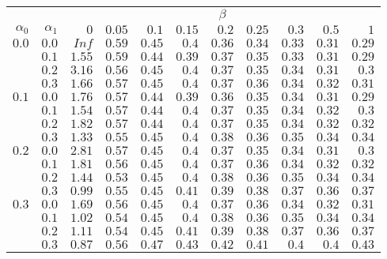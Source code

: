 \begin{tabular}{rr|rrrrrrrrr}
\hline\hline
 && \multicolumn{9}{c}{$\beta$}\\
 $\alpha_0$ & $\alpha_1$ & $0$ & $0.05$ & $0.1$ & $0.15$ & $0.2$ & $0.25$ & $0.3$ & $0.5$ & $1$ \\ 
 \hline
$0.0$ & $0.0$ & $Inf$ & $0.59$ & $0.45$ & $0.4$ & $0.36$ & $0.34$ & $0.33$ & $0.31$ & $0.29$\\ 
 & $0.1$ & $1.55$ & $0.59$ & $0.44$ & $0.39$ & $0.37$ & $0.35$ & $0.33$ & $0.31$ & $0.29$\\ 
 & $0.2$ & $3.16$ & $0.56$ & $0.45$ & $0.4$ & $0.37$ & $0.35$ & $0.34$ & $0.31$ & $0.3$\\ 
 & $0.3$ & $1.66$ & $0.57$ & $0.45$ & $0.4$ & $0.37$ & $0.36$ & $0.34$ & $0.32$ & $0.31$\\ 
\hline 
 $0.1$ & $0.0$ & $1.76$ & $0.57$ & $0.44$ & $0.39$ & $0.36$ & $0.35$ & $0.34$ & $0.31$ & $0.29$\\ 
 & $0.1$ & $1.54$ & $0.57$ & $0.44$ & $0.4$ & $0.37$ & $0.35$ & $0.34$ & $0.32$ & $0.3$\\ 
 & $0.2$ & $1.82$ & $0.57$ & $0.44$ & $0.4$ & $0.37$ & $0.35$ & $0.34$ & $0.32$ & $0.32$\\ 
 & $0.3$ & $1.33$ & $0.55$ & $0.45$ & $0.4$ & $0.38$ & $0.36$ & $0.35$ & $0.34$ & $0.34$\\ 
\hline 
 $0.2$ & $0.0$ & $2.81$ & $0.57$ & $0.45$ & $0.4$ & $0.37$ & $0.35$ & $0.34$ & $0.31$ & $0.3$\\ 
 & $0.1$ & $1.81$ & $0.56$ & $0.45$ & $0.4$ & $0.37$ & $0.36$ & $0.34$ & $0.32$ & $0.32$\\ 
 & $0.2$ & $1.44$ & $0.53$ & $0.45$ & $0.4$ & $0.38$ & $0.36$ & $0.35$ & $0.34$ & $0.34$\\ 
 & $0.3$ & $0.99$ & $0.55$ & $0.45$ & $0.41$ & $0.39$ & $0.38$ & $0.37$ & $0.36$ & $0.37$\\ 
\hline 
 $0.3$ & $0.0$ & $1.69$ & $0.56$ & $0.45$ & $0.4$ & $0.37$ & $0.36$ & $0.34$ & $0.32$ & $0.31$\\ 
 & $0.1$ & $1.02$ & $0.54$ & $0.45$ & $0.4$ & $0.38$ & $0.36$ & $0.35$ & $0.34$ & $0.34$\\ 
 & $0.2$ & $1.11$ & $0.54$ & $0.45$ & $0.41$ & $0.39$ & $0.38$ & $0.37$ & $0.36$ & $0.37$\\ 
 & $0.3$ & $0.87$ & $0.56$ & $0.47$ & $0.43$ & $0.42$ & $0.41$ & $0.4$ & $0.4$ & $0.43$\\ 
 \hline 
 \end{tabular}